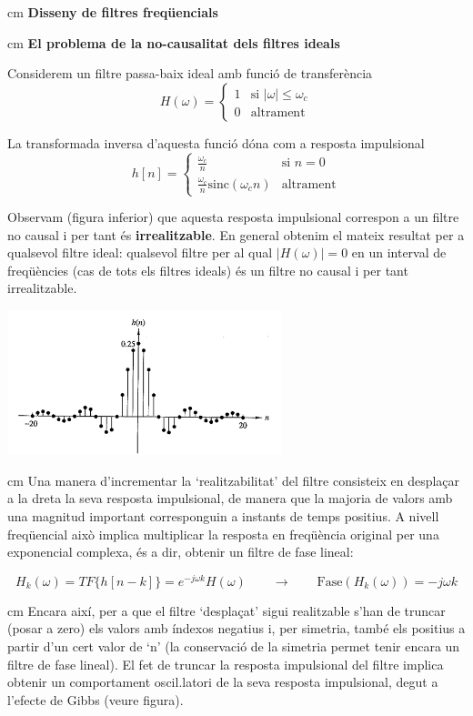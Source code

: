 \documentclass{article}
\begin{document}
 cm
\noindent
\textbf{\large Disseny de filtres freqüencials}

 cm
\textbf{El problema de la no-causalitat dels filtres ideals}

Considerem un filtre passa-baix ideal amb funció de transferència
\[
H(\omega)=\begin{cases} 1 & \text{si } |\omega| \leq \omega_c \\ 0 & \text{altrament} \end{cases}
\]

La transformada inversa d'aquesta funció dóna com a resposta impulsional
\[
h[n]=\begin{cases} \frac{\omega_c}{n} & \text{si } n=0 \\ 
\frac{\omega_c}{n} \mathrm{sinc}(\omega_c n) & \text{altrament} \end{cases}
\]

Observam (figura inferior)  que aquesta resposta impulsional correspon a un filtre no causal i per tant és \textbf{irrealitzable}.
En general obtenim el mateix resultat per a qualsevol filtre ideal: qualsevol filtre per al qual
$|H(\omega)|=0$ en un interval de freqüències (cas de tots els filtres ideals) és un filtre no causal i per
tant irrealitzable.


\begin{center}
\includegraphics[width=8cm]{passabaixideal.png}
\end{center}

 cm
Una manera d'incrementar la `realitzabilitat' del filtre consisteix en desplaçar a la dreta la seva resposta impulsional, de manera que la majoria de
valors amb una magnitud important corresponguin a instants de temps positius. A nivell freqüencial això implica multiplicar la resposta 
en freqüència original per una exponencial complexa, és a dir, obtenir un filtre de fase lineal:

\[
H_k(\omega)=TF\{ h[n-k] \}=e^{-j\omega k} H(\omega) \qquad \rightarrow \qquad \text{Fase}(H_k(\omega))=-j\omega k
\]

 cm
Encara així, per a que el filtre `desplaçat' sigui realitzable s'han de truncar (posar a zero) els valors amb índexos negatius i, per simetria,
també els positius a partir d'un cert valor de `n' (la conservació de la simetria permet tenir encara un filtre de fase lineal). 
El fet de truncar la resposta impulsional del filtre implica obtenir un comportament oscil.latori de la seva resposta impulsional, degut
a l'efecte de Gibbs (veure figura).
\end{document}

